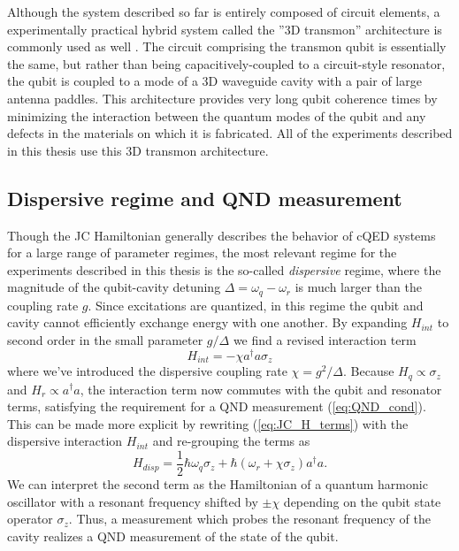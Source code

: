 Although the system described so far is entirely composed of circuit elements, a experimentally practical hybrid system called the ''3D transmon'' architecture is commonly used as well \cite{Paik_3DT}.  The circuit comprising the transmon qubit is essentially the same, but rather than being capacitively-coupled to a circuit-style resonator, the qubit is coupled to a mode of a 3D waveguide cavity with a pair of large antenna paddles.  This architecture provides very long qubit coherence times by minimizing the interaction between the quantum modes of the qubit and any defects in the materials on which it is fabricated.  All of the experiments described in this thesis use this 3D transmon architecture.

\subsection{Dispersive regime and QND measurement}

Though the JC Hamiltonian generally describes the behavior of cQED systems for a large range of parameter regimes, the most relevant regime for the experiments described in this thesis is the so-called \textit{dispersive} regime, where the magnitude of the qubit-cavity detuning $\Delta = \omega_q - \omega_r$ is much larger than the coupling rate $g$.  Since excitations are quantized, in this regime the qubit and cavity cannot efficiently exchange energy with one another.  By expanding $H_{int}$ to second order in the small parameter $g/\Delta$ we find a revised interaction term
\begin{equation}
H_{int} =- \chi a^{\dagger} a \sigma_z
\end{equation}
where we've introduced the dispersive coupling rate $\chi = g^2 / \Delta$. Because $H_q \propto \sigma_z$ and $H_r \propto a^\dagger a$, the interaction term now commutes with the qubit and resonator terms, satisfying the requirement for a QND measurement (\ref{eq:QND_cond}).  This can be made more explicit by rewriting (\ref{eq:JC_H_terms}) with the dispersive interaction $H_{int}$ and re-grouping the terms as
\begin{equation}
H_{disp} = \frac{1}{2} \hbar \omega_q \sigma_z + \hbar \left(\omega_r + \chi \sigma_z \right)a^\dagger a.
\label{eq:Hdisp_qumeas}
\end{equation}
We can interpret the second term as the Hamiltonian of a quantum harmonic oscillator with a resonant frequency shifted by $\pm \chi$ depending on the qubit state operator $\sigma_z$.  Thus, a measurement which probes the resonant frequency of the cavity realizes a QND measurement of the state of the qubit.

